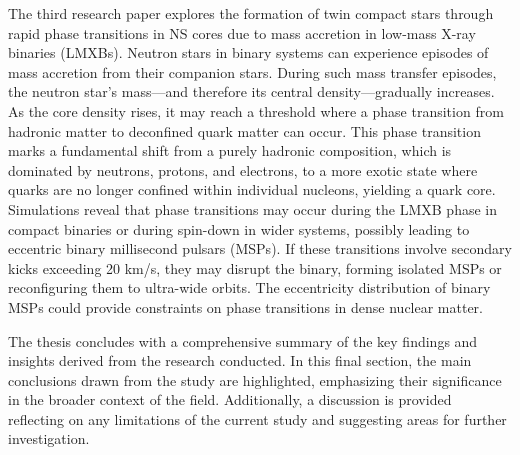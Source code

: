 \documentclass[main.tex]{subfiles}
\begin{document}
    The third research paper explores the formation of twin compact stars through rapid phase transitions in NS cores due to mass accretion in low-mass X-ray binaries (LMXBs).
    Neutron stars in binary systems can experience episodes of mass accretion from their companion stars. During such mass transfer episodes, the neutron star’s mass---and therefore its central density---gradually increases. As the core density rises, it may reach a threshold where a phase transition from hadronic matter to deconfined quark matter can occur. This phase transition marks a fundamental shift from a purely hadronic composition, which is dominated by neutrons, protons, and electrons, to a more exotic state where quarks are no longer confined within individual nucleons, yielding a quark core. Simulations reveal that phase transitions may occur during the LMXB phase in compact binaries or during spin-down in wider systems, possibly leading to eccentric binary millisecond pulsars (MSPs). If these transitions involve secondary kicks exceeding 20 km/s, they may disrupt the binary, forming isolated MSPs or reconfiguring them to ultra-wide orbits. The eccentricity distribution of binary MSPs could provide constraints on phase transitions in dense nuclear matter.

    The thesis concludes with a comprehensive summary of the key findings and insights derived from the research conducted. In this final section, the main conclusions drawn from the study are highlighted, emphasizing their significance in the broader context of the field. Additionally, a discussion is provided reflecting on any limitations of the current study and suggesting areas for further investigation.
\end{document}
